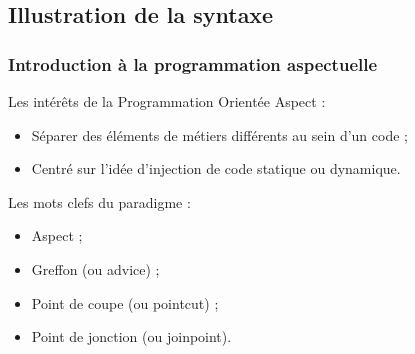 \documentclass[]{beamer}
\begin{document}
\begin{frame}
\begin{columns}[c]
\end{columns}
\end{frame}

\subsection{Illustration de la syntaxe}
\begin{frame}
\frametitle{Introduction à la programmation aspectuelle}
 {
    Les intérêts de la Programmation Orientée Aspect :
    \begin{itemize}
        \item Séparer des éléments de métiers différents au sein d'un code ;
        \item Centré sur l'idée d'injection de code statique ou dynamique.
    \end{itemize}
}
 {
    Les mots clefs du paradigme :
    \begin{itemize}
        \item Aspect ;
        \item Greffon (ou advice) ;
        \item Point de coupe (ou pointcut) ;
        \item Point de jonction (ou joinpoint).
    \end{itemize}
}
\end{frame}
\end{document}

